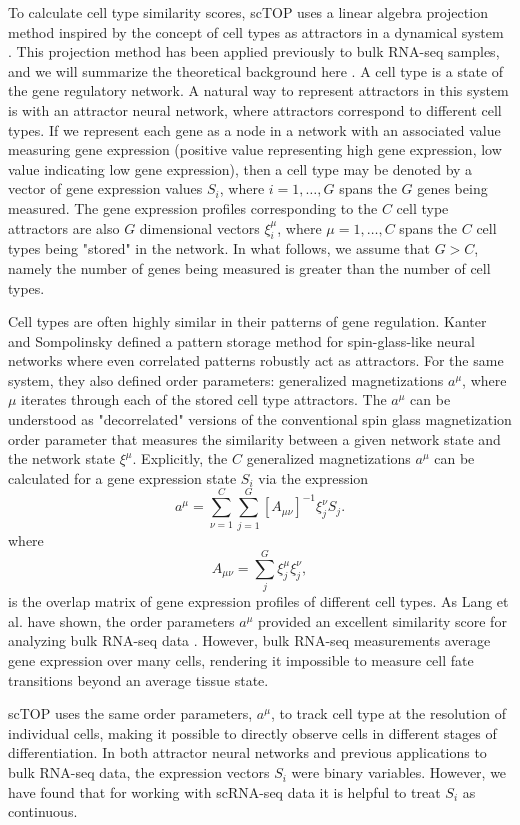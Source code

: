 \documentclass[aps,superscriptaddress, notitlepage,longbibliography]{revtex4-1}
\def\be{\begin{equation}}
\def\ee{\end{equation}}
\begin{document}
To calculate cell type similarity scores, scTOP uses a linear algebra projection method inspired by the concept of cell types as attractors in a dynamical system \cite{huang_cell_2005}. This projection method has been applied previously to bulk RNA-seq samples, and we will summarize the theoretical background here \cite{lang_epigenetic_2014}. A cell type is a state of the gene regulatory network. A natural way to represent attractors in this system is with an attractor neural network, where attractors correspond to different cell types. If we represent each gene as a node in a network with an associated value measuring gene expression (positive value representing high gene expression, low value indicating low gene expression), then a cell type may be denoted by a vector of gene expression values $S_i$, where $i=1,\ldots, G$ spans the $G$ genes being measured.  The gene expression profiles
corresponding to the $C$ cell type attractors are also $G$ dimensional vectors $\xi_i^\mu$, where $\mu=1,\ldots, C$ spans the $C$ cell types being "stored" in the network. In what follows, we assume that $G > C$, namely the number of genes being measured is greater than the number of cell types.

Cell types are often highly similar in their patterns of gene regulation. Kanter and Sompolinsky \cite{kanter_associative_1987} defined a pattern storage method for spin-glass-like neural networks where even correlated patterns robustly act as attractors. For the same system, they also defined order parameters: generalized magnetizations $a^{\mu}$, where $\mu$ iterates through each of the stored cell type attractors. The $a^\mu$ can be understood as "decorrelated" versions of the conventional spin glass magnetization order parameter that measures the similarity between a given network state and the network state $\xi^\mu$. 
Explicitly, the $C$ generalized magnetizations $a^\mu$ can be calculated for a gene expression state $S_i$ via the expression
\be \label{op_eqn}
a^\mu= \sum_{\nu=1}^C\sum_{j=1}^G [A_{\mu \nu}]^{-1}\xi_j^\nu S_j.
\ee
where
\be
A_{\mu \nu}= \sum_{j}^G  \xi_j^\mu \xi_j^\nu,
\ee
is the overlap matrix of gene expression profiles of different cell types. As Lang et al. have shown, the order parameters $a^{\mu}$ provided an excellent similarity score for analyzing bulk RNA-seq data \cite{lang_epigenetic_2014}. However, bulk RNA-seq measurements average gene expression over many cells, rendering it impossible to measure cell fate transitions beyond an average tissue state. 

scTOP uses the same order parameters, $a^{\mu}$, to track cell type at the resolution of individual cells, making it possible to directly observe cells in different stages of differentiation. In both attractor neural networks and previous applications to bulk RNA-seq data, the expression vectors $S_i$ were binary variables. However, we have found that for working with scRNA-seq data it is helpful to treat $S_i$ as continuous. 
\end{document}
